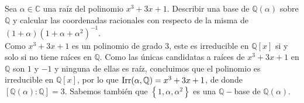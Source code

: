 \begin{ejercicio}
    Sea $\alpha\in \mathbb{C}$ una raíz del polinomio $x^3+3x+1$. Describir una base de $\mathbb{Q}(\alpha)$ sobre $\mathbb{Q}$ y calcular las coordenadas racionales con respecto de la misma de $(1+\alpha){(1+\alpha+\alpha^2)}^{-1}$.\\

    \noindent
    Como $x^3+3x+1$ es un polinomio de grado 3, este es irreducible en $\mathbb{Q}[x]$ si y solo si no tiene raíces en $\mathbb{Q}$. Como las únicas candidatas a raíces de $x^3+3x+1$ en $\mathbb{Q}$ son $1$ y $-1$ y ninguna de ellas es raíz, concluimos que el polinomio es irreducible en $\mathbb{Q}[x]$, por lo que $\operatorname{Irr}(\alpha,\mathbb{Q}) = x^3+3x+1$, de donde $[\mathbb{Q}(\alpha):\mathbb{Q}] = 3$. Sabemos también que $\left\{1,\alpha,\alpha^2\right\}$ es una $\mathbb{Q}-$base de $\mathbb{Q}(\alpha)$.\\


\end{ejercicio}
